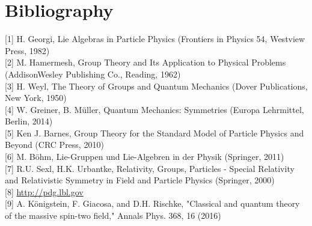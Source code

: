 \documentclass[10pt, letterpaper]{article}
\begin{document}
\section{Bibliography}
[1] H. Georgi, Lie Algebras in Particle Physics (Frontiers in Physics 54, Westview Press, 1982)\\[0pt]
[2] M. Hamermesh, Group Theory and Its Application to Physical Problems (AddisonWesley Publishing Co., Reading, 1962)\\[0pt]
[3] H. Weyl, The Theory of Groups and Quantum Mechanics (Dover Publications, New York, 1950)\\[0pt]
[4] W. Greiner, B. Müller, Quantum Mechanics: Symmetries (Europa Lehrmittel, Berlin, 2014)\\[0pt]
[5] Ken J. Barnes, Group Theory for the Standard Model of Particle Physics and Beyond (CRC Press, 2010)\\[0pt]
[6] M. Böhm, Lie-Gruppen und Lie-Algebren in der Physik (Springer, 2011)\\[0pt]
[7] R.U. Sexl, H.K. Urbantke, Relativity, Groups, Particles - Special Relativity and Relativistic Symmetry in Field and Particle Physics (Springer, 2000)\\[0pt]
[8] \href{http://pdg.lbl.gov}{http://pdg.lbl.gov}\\[0pt]
[9] A. Königstein, F. Giacosa, and D.H. Rischke, "Classical and quantum theory of the massive spin-two field," Annals Phys. 368, 16 (2016)
\end{document}

